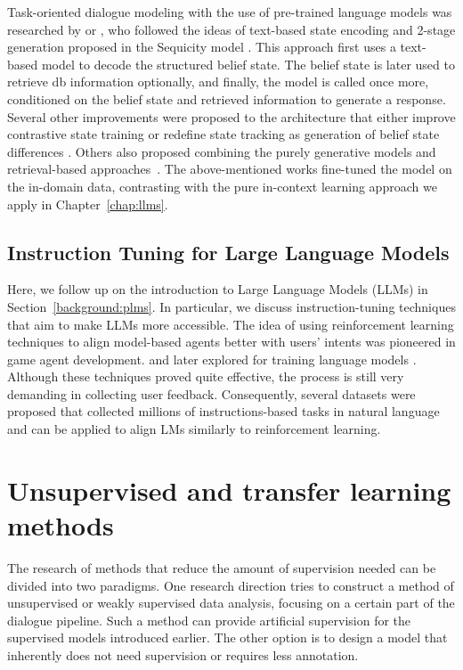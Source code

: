 Task-oriented dialogue modeling with the use of pre-trained language models was researched by \citet{zhang2019dialogpt} or \citet{peng-etal-2021-soloist}, who followed the ideas of text-based state encoding and 2-stage generation proposed in the Sequicity model \cite{lei2018sequicity}.
This approach first uses a text-based model to decode the structured belief state.
The belief state is later used to retrieve db information optionally, and finally, the model is called once more, conditioned on the belief state and retrieved information to generate a response.
Several other improvements were proposed to the architecture that either improve contrastive state training \citep{kulhanek-etal-2021-augpt} or redefine state tracking as generation of belief state differences \citep{lin-etal-2020-mintl}.
Others also proposed combining the purely generative models and retrieval-based approaches~\citep{pandey-etal-2018-exemplar,cai-etal-2019-retrieval,nekvinda-dusek-2022-aargh}.
The above-mentioned works fine-tuned the model on the in-domain data, contrasting with the pure in-context learning approach we apply in Chapter~\ref{chap:llms}.

\subsection{Instruction Tuning for Large Language Models}
Here, we follow up on the introduction to Large Language Models (LLMs) in Section~\ref{background:plms}.
In particular, we discuss instruction-tuning techniques that aim to make LLMs more accessible. 
The idea of using reinforcement learning techniques to align model-based agents better with users' intents was pioneered in game agent development. \cite{christiano2017deep} and later explored for training language models \cite{ziegler2019fine,ouyang2022training}.
Although these techniques proved quite effective, the process is still very demanding in collecting user feedback.
Consequently, several datasets were proposed \cite{supernaturalinstructions,iyer2022opt,black2022gpt} that collected millions of instructions-based tasks in natural language and can be applied to align LMs similarly to reinforcement learning.

\section{Unsupervised and transfer learning methods}
\label{sec:relwork-unsup}
The research of methods that reduce the amount of supervision needed can be divided into two paradigms.
One research direction tries to construct a method of unsupervised or weakly supervised data analysis, focusing on a certain part of the dialogue pipeline.
Such a method can provide artificial supervision for the supervised models introduced earlier.
The other option is to design a model that inherently does not need supervision or requires less annotation.

